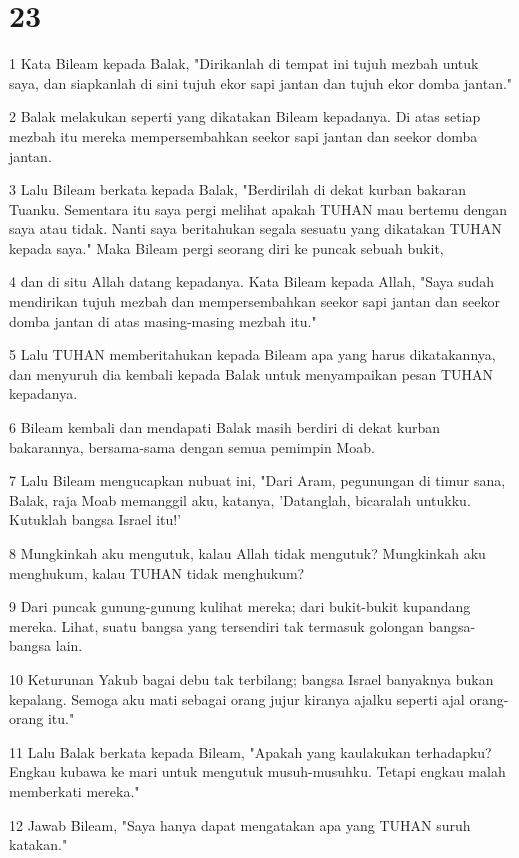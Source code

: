 \chapter{23}

\par 1 Kata Bileam kepada Balak, "Dirikanlah di tempat ini tujuh mezbah untuk saya, dan siapkanlah di sini tujuh ekor sapi jantan dan tujuh ekor domba jantan."
\par 2 Balak melakukan seperti yang dikatakan Bileam kepadanya. Di atas setiap mezbah itu mereka mempersembahkan seekor sapi jantan dan seekor domba jantan.
\par 3 Lalu Bileam berkata kepada Balak, "Berdirilah di dekat kurban bakaran Tuanku. Sementara itu saya pergi melihat apakah TUHAN mau bertemu dengan saya atau tidak. Nanti saya beritahukan segala sesuatu yang dikatakan TUHAN kepada saya." Maka Bileam pergi seorang diri ke puncak sebuah bukit,
\par 4 dan di situ Allah datang kepadanya. Kata Bileam kepada Allah, "Saya sudah mendirikan tujuh mezbah dan mempersembahkan seekor sapi jantan dan seekor domba jantan di atas masing-masing mezbah itu."
\par 5 Lalu TUHAN memberitahukan kepada Bileam apa yang harus dikatakannya, dan menyuruh dia kembali kepada Balak untuk menyampaikan pesan TUHAN kepadanya.
\par 6 Bileam kembali dan mendapati Balak masih berdiri di dekat kurban bakarannya, bersama-sama dengan semua pemimpin Moab.
\par 7 Lalu Bileam mengucapkan nubuat ini, "Dari Aram, pegunungan di timur sana, Balak, raja Moab memanggil aku, katanya, 'Datanglah, bicaralah untukku. Kutuklah bangsa Israel itu!'
\par 8 Mungkinkah aku mengutuk, kalau Allah tidak mengutuk? Mungkinkah aku menghukum, kalau TUHAN tidak menghukum?
\par 9 Dari puncak gunung-gunung kulihat mereka; dari bukit-bukit kupandang mereka. Lihat, suatu bangsa yang tersendiri tak termasuk golongan bangsa-bangsa lain.
\par 10 Keturunan Yakub bagai debu tak terbilang; bangsa Israel banyaknya bukan kepalang. Semoga aku mati sebagai orang jujur kiranya ajalku seperti ajal orang-orang itu."
\par 11 Lalu Balak berkata kepada Bileam, "Apakah yang kaulakukan terhadapku? Engkau kubawa ke mari untuk mengutuk musuh-musuhku. Tetapi engkau malah memberkati mereka."
\par 12 Jawab Bileam, "Saya hanya dapat mengatakan apa yang TUHAN suruh katakan."
